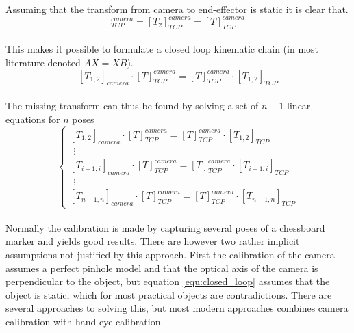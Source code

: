 \noindent Assuming that the transform from camera to end-effector is static it is clear that.\\

\begin{equation}
[T_{1}]_{TCP}^{camera} = [T_{2}]_{TCP}^{camera} = [T]_{TCP}^{camera}
\end{equation}\\ 

\noindent This makes it possible to formulate a closed loop kinematic chain (in most literature denoted $ AX=XB $).\\

\begin{equation} \label{equ:closed_loop}
	[T_{1,2}]_{camera} \cdot [T]_{TCP}^{camera} = [T]_{TCP}^{camera} \cdot [T_{1,2}]_{TCP}
\end{equation}\\ 

\noindent The missing transform can thus be found by solving a set of $ n-1 $ linear equations for $ n $ poses \\

\begin{equation}
\left\{\begin{matrix}
[T_{1,2}]_{camera} \cdot [T]_{TCP}^{camera} = [T]_{TCP}^{camera} \cdot [T_{1,2}]_{TCP} \\ 
\ \ \vdots 
\\ 
[T_{i-1,i}]_{camera} \cdot [T]_{TCP}^{camera} = [T]_{TCP}^{camera} \cdot [T_{i-1,i}]_{TCP}\\ 
\ \ \vdots 
\\ 
[T_{n-1,n}]_{camera} \cdot [T]_{TCP}^{camera} = [T]_{TCP}^{camera} \cdot [T_{n-1,n}]_{TCP}
\end{matrix}\right.
\end{equation}\\ 

\noindent Normally the calibration is made by capturing several poses of a chessboard marker and yields good results. There are however two rather implicit assumptions \cite{Horaud1995} not justified by this approach. First the calibration of the camera assumes a perfect pinhole model and that the optical axis of the camera is perpendicular to the object, but equation \ref{equ:closed_loop} assumes that the object is static, which for most practical objects are contradictions. There are several approaches to solving this, but most modern approaches combines camera calibration with hand-eye calibration. 










